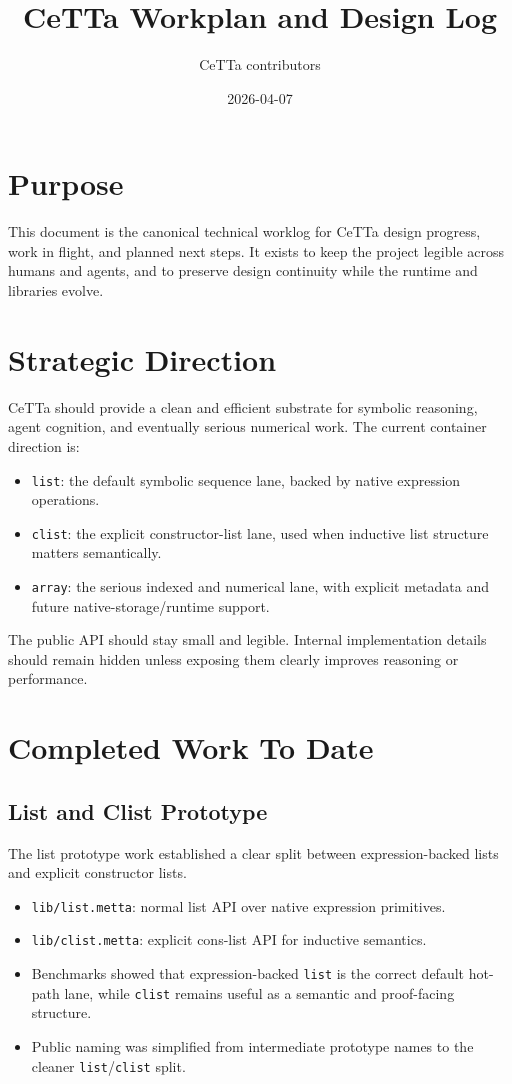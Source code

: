 \documentclass[11pt]{article}
\title{CeTTa Workplan and Design Log}
\author{CeTTa contributors}
\date{2026-04-07}
\begin{document}
\maketitle

\section{Purpose}
This document is the canonical technical worklog for CeTTa design progress, work in flight, and planned next steps. It exists to keep the project legible across humans and agents, and to preserve design continuity while the runtime and libraries evolve.

\section{Strategic Direction}
CeTTa should provide a clean and efficient substrate for symbolic reasoning, agent cognition, and eventually serious numerical work. The current container direction is:
\begin{itemize}
  \item \texttt{list}: the default symbolic sequence lane, backed by native expression operations.
  \item \texttt{clist}: the explicit constructor-list lane, used when inductive list structure matters semantically.
  \item \texttt{array}: the serious indexed and numerical lane, with explicit metadata and future native-storage/runtime support.
\end{itemize}
The public API should stay small and legible. Internal implementation details should remain hidden unless exposing them clearly improves reasoning or performance.

\section{Completed Work To Date}
\subsection{List and Clist Prototype}
The list prototype work established a clear split between expression-backed lists and explicit constructor lists.
\begin{itemize}
  \item \texttt{lib/list.metta}: normal list API over native expression primitives.
  \item \texttt{lib/clist.metta}: explicit cons-list API for inductive semantics.
  \item Benchmarks showed that expression-backed \texttt{list} is the correct default hot-path lane, while \texttt{clist} remains useful as a semantic and proof-facing structure.
  \item Public naming was simplified from intermediate prototype names to the cleaner \texttt{list}/\texttt{clist} split.
\end{itemize}
\end{document}
